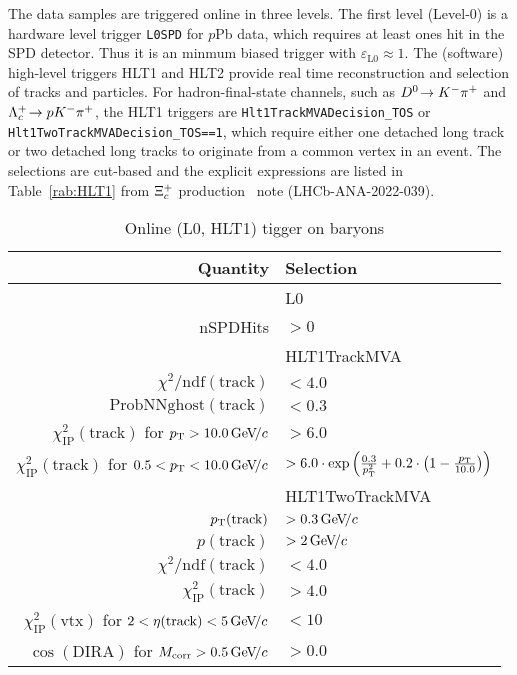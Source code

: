 The data samples are triggered online in three levels.
The first level (Level-0) is a hardware level trigger {\tt L0SPD} for $p$Pb data,
which requires at least ones hit in the SPD detector.
Thus it is an minmum biased trigger with $\varepsilon_\mathrm{L0} \approx 1$.
The (software) high-level triggers HLT1 and HLT2 provide real time reconstruction and selection
of tracks and particles.
For hadron-final-state channels, such as ${{D}^0}\!\rightarrow {\ensuremath{{K}^-}}{\ensuremath{{\pi}^+}}$ and ${{\Lambda}^+_{c}}\!\rightarrow {\ensuremath{p}}{\ensuremath{{K}^-}}{\ensuremath{{\pi}^+}}$,
the HLT1 triggers are {\tt{Hlt1TrackMVADecision\_TOS}} or {\tt{Hlt1TwoTrackMVADecision\_TOS==1}},
which require either one detached long track or two detached long tracks
to originate from a common vertex in an event.
The selections are cut-based and the explicit expressions
are listed in Table~\ref{rab:HLT1} from $\Xi_c^+$ production~\cite{LHCb-PAPER-2022-041} note (LHCb-ANA-2022-039).
\begin{table}
    \caption{Online (L0, HLT1) tigger on \Lc baryons}
    \centering 
\begin{tabular}{rl}
    \hline Quantity & Selection \\
    \hline & L0                 \\
    nSPDHits & $>0$ \\
    \hline & HLT1TrackMVA  \\
    $\chi^2 / \mathrm{ndf}(\mathrm{track})$ & $<4.0$\\
    $\mathrm{ProbNNghost}(\mathrm{track})$ & $<0.3$ \\
    $\chi_{\mathrm{IP}}^2(\mathrm{track})$ for $p_{\mathrm{T}}>10.0 \text{\,Ge\kern -0.1em V\!/}c$ & $>6.0$ \\
    $\chi_{\mathrm{IP}}^2(\mathrm{track})$ for $0.5<p_{\mathrm{T}}<10.0 \text{\,Ge\kern -0.1em V\!/}c$
    & $>6.0\cdot\exp\left(\frac{0.3}{p_{\mathrm{T}}^2} +0.2\cdot\left(1-\frac{p_{\mathrm{T}}}{10.0}\right)\right)$ \\
    \hline & HLT1TwoTrackMVA \\
    $p_{\mathrm{T}}(\mathrm{track})$ & $>0.3 \text{\,Ge\kern -0.1em V\!/}c$ \\
    $p(\mathrm{track})$ & $>2\text{\,Ge\kern -0.1em V\!/}c$ \\
    $\chi^2 / \mathrm{ndf}(\mathrm{track})$ & $<4.0$\\
    $\chi_{\mathrm{IP}}^2(\mathrm{track})$& $>4.0$ \\
    $\chi_{\mathrm{IP}}^2(\mathrm{vtx})$ for $2<\eta(\mathrm{track})<5 \text{\,Ge\kern -0.1em V\!/}c$ & $<10$ \\
    $\cos(\mathrm{DIRA})$ for $M_\mathrm{corr}>0.5\text{\,Ge\kern -0.1em V\!/}c$ & $>0.0$ \\
    \hline
\end{tabular}\label{tab:HLT1}
\end{table}

